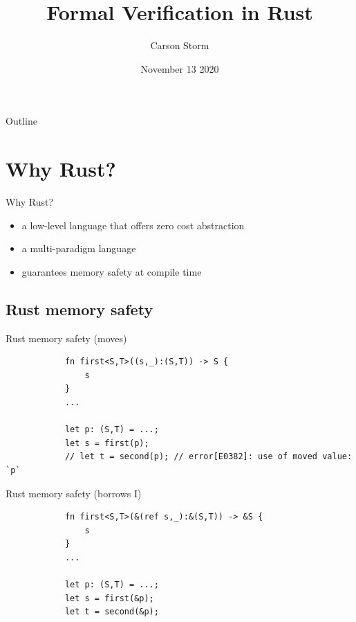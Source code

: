 \documentclass[usenames,dvipsnames,aspectratio=169]{beamer}
\author{Carson Storm}
\date{November 13 2020}
\title{Formal Verification in Rust}
\institute[]{University of Utah}
\begin{document}
\maketitle


\begin{frame}{Outline}
    \tableofcontents
\end{frame}

\section{Why Rust?}
\begin{frame}{Why Rust?}
    \begin{itemize}
        \item a low-level language that offers zero cost abstraction
        \item a multi-paradigm language
        \item guarantees memory safety at compile time
    \end{itemize}
\end{frame}

\subsection{Rust memory safety}
\begin{frame}[fragile]{Rust memory safety (moves)}
    \begin{block}{}
        \begin{verbatim}
            fn first<S,T>((s,_):(S,T)) -> S {
                s
            }
            ...
            
            let p: (S,T) = ...;
            let s = first(p);
            // let t = second(p); // error[E0382]: use of moved value: `p`
        \end{verbatim}   
    \end{block}
\end{frame}

\begin{frame}[fragile]{Rust memory safety (borrows I)}
    \begin{block}{}
        \begin{verbatim}
            fn first<S,T>(&(ref s,_):&(S,T)) -> &S {
                s
            }
            ...
            
            let p: (S,T) = ...;
            let s = first(&p);
            let t = second(&p);
        \end{verbatim}
    \end{block}
\end{frame}
\end{document}
